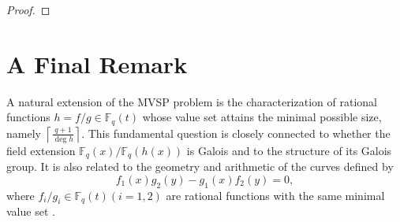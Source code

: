 \documentclass[11pt]{amsart}
\newcommand{\F}{\mathbb{F}}
\theoremstyle{definition}
\theoremstyle{remark}
\begin{document}
\begin{proof}
%
%
%
%

\end{proof}




\section{A Final Remark}

A natural extension of the MVSP problem is the characterization of rational functions $h=f / g \in \mathbb{F}_q(t)$ whose value set attains the minimal possible size, namely $\left\lceil\frac{q+1}{\operatorname{deg} h}\right\rceil$. This fundamental question is closely connected to whether the field extension $\mathbb{F}_q(x) / \mathbb{F}_q(h(x))$ is Galois and to the structure of its Galois group. It is also related to the geometry and arithmetic of the curves defined by
$$
f_1(x) g_2(y)-g_1(x) f_2(y)=0,
$$
where $f_i / g_i \in \mathbb{F}_q(t)(i=1,2)$ are rational functions with the same minimal value set \cite{BBQ21}.
\end{document}
